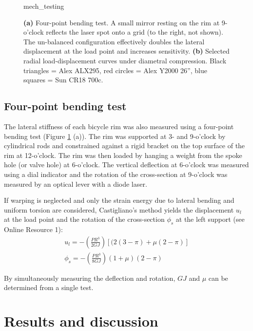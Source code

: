 \documentclass[../thesis.tex]{subfiles}
\begin{document}
\begin{figure}
  \centering
  {mech_testing}
  \caption{\textbf{(a)} Four-point bending test. A small mirror resting on the rim at 9-o’clock reflects the laser spot onto a grid (to the right, not shown). The un-balanced configuration effectively doubles the lateral displacement at the load point and increases sensitivity. \textbf{(b)} Selected radial load-displacement curves under diametral compression. Black triangles = Alex ALX295, red circles = Alex Y2000 26'', blue squares = Sun CR18 700c.}
  \label{fig:mech_tests}
\end{figure}

\subsection{Four-point bending test}

The lateral stiffness of each bicycle rim was also measured using a four-point bending test (Figure \ref{fig:mech_tests} (a)). The rim was supported at 3- and 9-o'clock by cylindrical rods and constrained against a rigid bracket on the top surface of the rim at 12-o'clock. The rim was then loaded by hanging a weight from the spoke hole (or valve hole) at 6-o'clock. The vertical deflection at 6-o'clock was measured using a dial indicator and the rotation of the cross-section at 9-o'clock was measured by an optical lever with a diode laser.

If warping is neglected and only the strain energy due to lateral bending and uniform torsion are considered, Castigliano's method yields the displacement $u_l$ at the load point and the rotation of the cross-section $\phi_s$ at the left support (see Online Resource 1):
  \begin{equation}\label{eq:u_4p}
  \begin{array}{c}
  u_l = -\left(\frac{PR^3}{2GJ}\right) [(2(3-\pi)+\mu(2-\pi)]\\
  \phi_s = -\left(\frac{PR^3}{8GJ}\right) (1+\mu)(2-\pi)
  \end{array}
  \end{equation}

By simultaneously measuring the deflection and rotation, $GJ$ and $\mu$ can be determined from a single test.

\section{Results and discussion}
\end{document}
